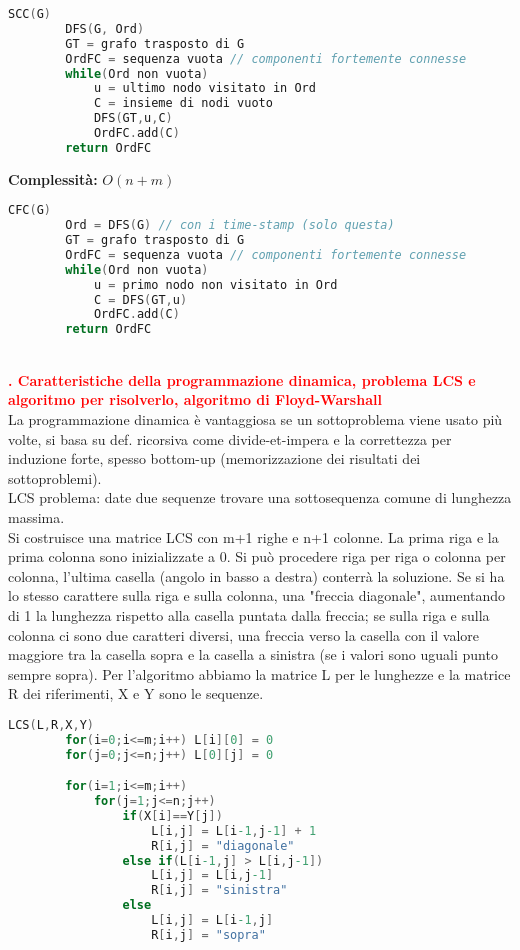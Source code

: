 \documentclass[12pt]{article}
\newcounter{questioncounter}
\newcommand{\question}[1]{
    \stepcounter{questioncounter}
    \textbf{\\\textcolor{red}{\arabic{questioncounter}. #1}}\\
}
\begin{document}
\begin{lstlisting}[language=C]
    SCC(G)
        DFS(G, Ord)
        GT = grafo trasposto di G
        OrdFC = sequenza vuota // componenti fortemente connesse
        while(Ord non vuota)
            u = ultimo nodo visitato in Ord
            C = insieme di nodi vuoto
            DFS(GT,u,C)
            OrdFC.add(C)
        return OrdFC    
\end{lstlisting}
\textbf{Complessità:} $O(n+m)$
\begin{lstlisting}[language=C]
    CFC(G)
        Ord = DFS(G) // con i time-stamp (solo questa)
        GT = grafo trasposto di G
        OrdFC = sequenza vuota // componenti fortemente connesse
        while(Ord non vuota)
            u = primo nodo non visitato in Ord
            C = DFS(GT,u)
            OrdFC.add(C)
        return OrdFC    
\end{lstlisting}
\question{Caratteristiche della programmazione dinamica, problema LCS e algoritmo per risolverlo, algoritmo di Floyd-Warshall}
La programmazione dinamica è vantaggiosa se un sottoproblema viene usato più volte, si basa su def. ricorsiva come divide-et-impera e la correttezza per induzione forte, spesso bottom-up (memorizzazione dei risultati dei sottoproblemi).\\
LCS problema: date due sequenze trovare una sottosequenza comune di lunghezza massima.\\
Si costruisce una matrice LCS con m+1 righe e n+1 colonne. La prima riga e la prima colonna sono inizializzate a 0. Si può procedere riga per riga o colonna per colonna, l'ultima casella (angolo in basso a destra) conterrà la soluzione. Se si ha lo stesso carattere sulla riga e sulla colonna, una "freccia diagonale", aumentando di 1 la lunghezza rispetto alla casella puntata dalla freccia; se sulla riga e sulla colonna ci sono due caratteri diversi, una freccia verso la casella con il valore maggiore tra la casella sopra e la casella a sinistra (se i valori sono uguali punto sempre sopra). Per l'algoritmo abbiamo la matrice L per le lunghezze e la matrice R dei riferimenti, X e Y sono le sequenze.
\begin{lstlisting}[language=C]
    LCS(L,R,X,Y)
        for(i=0;i<=m;i++) L[i][0] = 0
        for(j=0;j<=n;j++) L[0][j] = 0

        for(i=1;i<=m;i++)
            for(j=1;j<=n;j++)
                if(X[i]==Y[j])
                    L[i,j] = L[i-1,j-1] + 1
                    R[i,j] = "diagonale"
                else if(L[i-1,j] > L[i,j-1])
                    L[i,j] = L[i,j-1]
                    R[i,j] = "sinistra"
                else
                    L[i,j] = L[i-1,j]
                    R[i,j] = "sopra"
\end{lstlisting}
\end{document}
